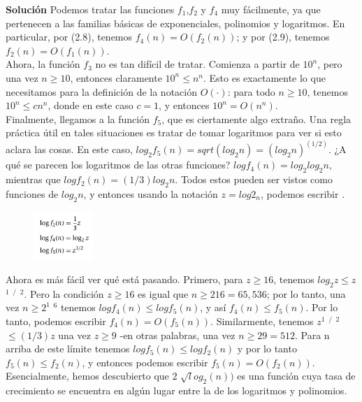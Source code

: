\documentclass[a4paper]{article}
\begin{document}
\textbf{Solución} Podemos tratar las funciones $f_1$,$ f_2$ y $f_4$ muy fácilmente, ya que pertenecen a las familias básicas de exponenciales, polinomios y logaritmos. En particular, por (2.8), tenemos $f_4 (n) = O (f_2 (n))$; y por (2.9), tenemos $f_2 (n) = O (f_1 (n))$.\\

Ahora, la función $f_3$ no es tan difícil de tratar. Comienza a partir de $10 ^ n$, pero una vez $n ≥ 10$, entonces claramente $10 ^ n ≤ n ^ n$. Esto es exactamente lo que necesitamos para la definición de la notación $O (·)$: para todo $n ≥ 10$, tenemos $10 ^ n ≤ cn ^ n$, donde en este caso $c = 1$, y entonces $10 ^ n = O (n ^ n)$.\\

Finalmente, llegamos a la función $f_5$, que es ciertamente algo extraño. Una regla práctica útil en tales situaciones es tratar de tomar logaritmos para ver si esto aclara las cosas. En este caso, $log_2 f_5 (n) = sqrt (log_2 n) = (log_2 n) ^ (1/2)$. ¿A qué se parecen los logaritmos de las otras funciones? $log f_4 (n) = log_2 log_2 n$, mientras que $log f_2 (n) = (1/3) log_2 n$. Todos estos pueden ser vistos como funciones de $log_2 n$, y entonces usando la notación $z = log2_n$, podemos escribir .

\begin{figure}[h] 
  \centering
    \includegraphics[width=0.2\textwidth]{Imagenes-Seccion2/form2_2.PNG}
\end{figure}

Ahora es más fácil ver qué está pasando. Primero, para $z ≥ 16$, tenemos $log_2 z ≤  z$  $^1$ $^/$ $^2$. Pero la condición $z ≥ 16$ es igual que $n ≥ 216 = 65, 536$; por lo tanto, una vez $n ≥ 2 ^1$ $^6$ tenemos $log f_4 (n) ≤ log f_5 (n)$, y así $f_4 (n) ≤ f_5 (n)$. Por lo tanto, podemos escribir $f_4 (n) = O (f_5 (n))$. Similarmente, tenemos $z^1$ $^/$ $^ 2$ $≤ (1/3)z$ una vez $z ≥ 9$ -en otras palabras, una vez $n ≥ 29 = 512$. Para n arriba de este límite tenemos $log f_5 (n) ≤ log f_2 (n)$ y por lo tanto $f_5 (n) ≤ f_2 (n)$, y entonces podemos escribir $f_5 (n) = O (f_2 (n))$. Esencialmente, hemos descubierto que $2$ $\sqrt log_2 (n))$ es una función cuya tasa de crecimiento se encuentra en algún lugar entre la de los logaritmos y polinomios.\\
\end{document}
